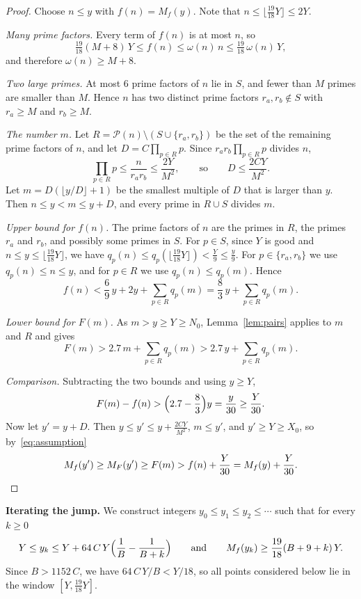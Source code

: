 \documentclass[11pt,a4paper]{amsart}
\theoremstyle{remark}
\begin{document}
\begin{proof}
Choose $n \le y$ with $f(n) = M_f(y)$. Note that $n \le \lfloor \frac{19}{18} Y \rfloor \le 2Y$.

\emph{Many prime factors.} Every term of $f(n)$ is at most $n$, so
\[
\tfrac{19}{18} (M + 8)\, Y \le f(n) \le \omega(n)\, n \le \tfrac{19}{18}\, \omega(n)\, Y,
\]
and therefore $\omega(n) \ge M + 8$.

\emph{Two large primes.} At most $6$ prime factors of $n$ lie in $S$, and fewer than $M$ primes are smaller than $M$. Hence $n$ has two distinct prime factors $r_a, r_b \notin S$ with $r_a \ge M$ and $r_b \ge M$.

\emph{The number $m$.} Let $R = \mathcal{P}(n) \setminus (S \cup \{r_a, r_b\})$ be the set of the remaining prime factors of $n$, and let $D = C \prod_{p \in R} p$. Since $r_a r_b \prod_{p \in R} p$ divides $n$,
\[
\prod_{p \in R} p \le \frac{n}{r_a r_b} \le \frac{2Y}{M^2}, \qquad\text{so}\qquad D \le \frac{2 C Y}{M^2}.
\]
Let $m = D(\lfloor y/D \rfloor + 1)$ be the smallest multiple of $D$ that is larger than $y$. Then $n \le y < m \le y + D$, and every prime in $R \cup S$ divides $m$.

\emph{Upper bound for $f(n)$.} The prime factors of $n$ are the primes in $R$, the primes $r_a$ and $r_b$, and possibly some primes in $S$. For $p \in S$, since $Y$ is good and $n \le y \le \lfloor \frac{19}{18} Y \rfloor$, we have $q_p(n) \le q_p(\lfloor \frac{19}{18} Y \rfloor) < \frac{Y}{9} \le \frac{y}{9}$. For $p \in \{r_a, r_b\}$ we use $q_p(n) \le n \le y$, and for $p \in R$ we use $q_p(n) \le q_p(m)$. Hence
\[
f(n) < \frac{6}{9}\, y + 2y + \sum_{p \in R} q_p(m) = \frac{8}{3}\, y + \sum_{p \in R} q_p(m).
\]

\emph{Lower bound for $F(m)$.} As $m > y \ge Y \ge N_0$, Lemma~\ref{lem:pairs} applies to $m$ and $R$ and gives
\[
F(m) > 2.7\, m + \sum_{p \in R} q_p(m) > 2.7\, y + \sum_{p \in R} q_p(m).
\]

\emph{Comparison.} Subtracting the two bounds and using $y \ge Y$,
\[
F(m) - f(n) > \Bigl(2.7 - \frac{8}{3}\Bigr) y = \frac{y}{30} \ge \frac{Y}{30}.
\]
Now let $y' = y + D$. Then $y \le y' \le y + \frac{2CY}{M^2}$, $m \le y'$, and $y' \ge Y \ge X_0$, so by~\eqref{eq:assumption}
\[
M_f(y') \ge M_F(y') \ge F(m) > f(n) + \frac{Y}{30} = M_f(y) + \frac{Y}{30}. \qedhere
\]
\end{proof}

\medskip
\noindent\textbf{Iterating the jump.} We construct integers $y_0 \le y_1 \le y_2 \le \cdots$ such that for every $k \ge 0$
\begin{equation}\label{eq:invariant}
Y \le y_k \le Y + 64\, C\, Y \Bigl(\frac{1}{B} - \frac{1}{B + k}\Bigr)
\qquad\text{and}\qquad
M_f(y_k) \ge \frac{19}{18} (B + 9 + k)\, Y.
\end{equation}
Since $B > 1152\, C$, we have $64\, C\, Y / B < Y/18$, so all points considered below lie in the window $[Y, \frac{19}{18} Y]$.
\end{document}
